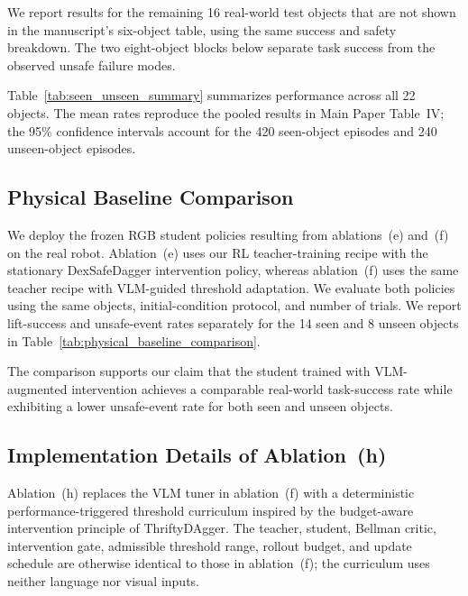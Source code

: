 We report results for the remaining 16 real-world test objects that are not
shown in the manuscript's six-object table, using the same success and safety
breakdown. The two eight-object blocks below separate task success from the
observed unsafe failure modes.



Table~\ref{tab:seen_unseen_summary} summarizes performance across all 22
objects. The mean rates reproduce the pooled results in Main Paper Table~IV;
the 95\% confidence intervals account for the 420 seen-object episodes and 240
unseen-object episodes.




\subsection{Physical Baseline Comparison}
We deploy the frozen RGB student policies resulting from ablations~(e) and~(f)
on the real robot. Ablation~(e) uses our RL teacher-training recipe with the stationary
DexSafeDagger intervention policy, whereas ablation~(f) uses the same teacher
recipe with VLM-guided threshold adaptation. We evaluate both policies
using the same objects, initial-condition protocol, and number of trials. We
report lift-success and unsafe-event rates separately for the 14 seen and 8
unseen objects in Table~\ref{tab:physical_baseline_comparison}.



The comparison supports our claim that the student trained with VLM-augmented intervention
achieves a comparable real-world task-success rate while exhibiting a lower
unsafe-event rate for both seen and unseen objects.

\subsection{Implementation Details of Ablation~(h)}
Ablation~(h) replaces the VLM tuner in ablation~(f) with a deterministic
performance-triggered threshold curriculum inspired by the budget-aware
intervention principle of ThriftyDAgger. The teacher, student, Bellman critic,
intervention gate, admissible threshold range, rollout budget, and update
schedule are otherwise identical to those in ablation~(f); the curriculum uses
neither language nor visual inputs.

